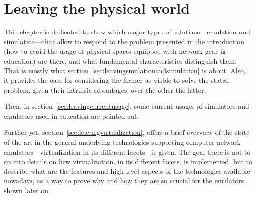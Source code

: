 
\chapter{Leaving the physical world}
\label{ch:leavingthephysicalworld}

This chapter is dedicated to show which major types of solutions---emulation and simulation---that allow to respond to the problem presented in the introduction (how to avoid the usage of physical spaces equipped with network gear in education) are there, and what fundamental characteristics distinguish them.
That is mostly what section~\ref{sec:leavingemulationandsimulation} is about.
Also, it provides the case for considering the former as viable to solve the stated problem, given their intrinsic advantages, over the other the latter.

Then, in section~\ref{sec:leavingcurrentusage}, some current usages of simulators and emulators used in education are pointed out.

Further yet, section~\ref{sec:leavingvirtualization}, offers a brief overview of the state of the art in the general underlying technologies supporting computer network emulators---virtualization in its different facets---is given.
The goal there is not to go into details on how virtualization, in its different facets, is implemented, but to describe what are the features and high-level aspects of the technologies available nowadays, as a way to prove why and how they are so crucial for the emulators shown later on.







